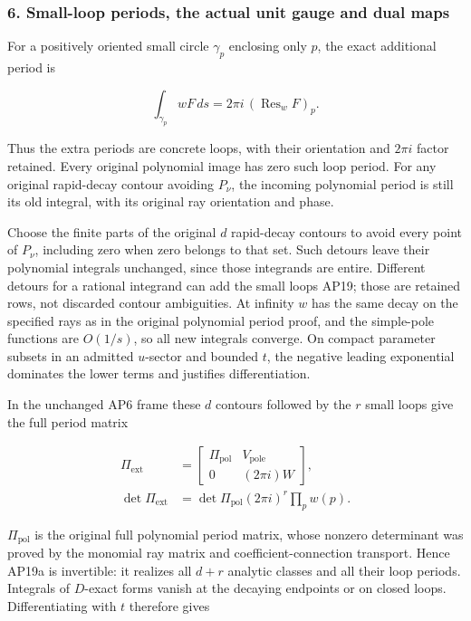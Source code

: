 \subsubsection{6. Small-loop periods, the actual unit gauge and dual maps}\label{endpoint-analytic_pole--small-loop-periods-the-actual-unit-gauge-and-dual-maps}

For a positively oriented small circle \(\gamma_p\) enclosing only \(p\), the exact additional period is

\[
\int_{\gamma_p}wF\,ds
=2\pi i\,(\operatorname{Res}_w F)_p.
\tag{AP19}
\]

Thus the extra periods are concrete loops, with their orientation and \(2\pi i\) factor retained. Every original polynomial image has zero such loop period. For any original rapid-decay contour avoiding \(P_\nu\), the incoming polynomial period is still its old integral, with its original ray orientation and phase.

Choose the finite parts of the original \(d\) rapid-decay contours to avoid every point of \(P_\nu\), including zero when zero belongs to that set. Such detours leave their polynomial integrals unchanged, since those integrands are entire. Different detours for a rational integrand can add the small loops AP19; those are retained rows, not discarded contour ambiguities. At infinity \(w\) has the same decay on the specified rays as in the original polynomial period proof, and the simple-pole functions are \(O(1/s)\), so all new integrals converge. On compact parameter subsets in an admitted \(u\)-sector and bounded \(t\), the negative leading exponential dominates the lower terms and justifies differentiation.

In the unchanged AP6 frame these \(d\) contours followed by the \(r\) small loops give the full period matrix

\[
\begin{aligned}
\Pi_{\mathrm{ext}}&=\begin{bmatrix}
\Pi_{\mathrm{pol}}&V_{\mathrm{pole}}\\0&(2\pi i)W
\end{bmatrix},\\
\det\Pi_{\mathrm{ext}}&=\det\Pi_{\mathrm{pol}}(2\pi i)^r\prod_p w(p).
\end{aligned}
\tag{AP19a}
\]

\(\Pi_{\mathrm{pol}}\) is the original full polynomial period matrix, whose nonzero determinant was proved by the monomial ray matrix and coefficient-connection transport. Hence AP19a is invertible: it realizes all \(d+r\) analytic classes and all their loop periods. Integrals of \(D\)-exact forms vanish at the decaying endpoints or on closed loops. Differentiating with \(t\) therefore gives

